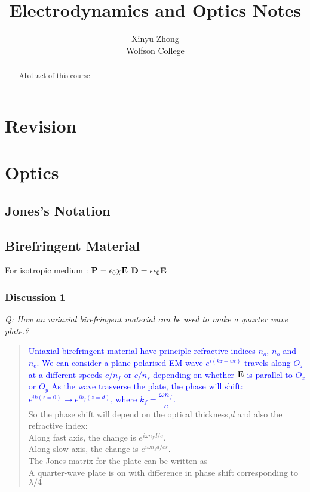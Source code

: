 \documentclass[12pt,a4paper]{article}
\author{Xinyu Zhong\\Wolfson College}
\title{Electrodynamics and Optics Notes}
\begin{document}
\begin{titlepage}
    \maketitle
\end{titlepage}

\tableofcontents

\newpage

\begin{abstract}
\noindent
Abstract of this course
\end{abstract}

\section{Revision}
\section{Optics}
\subsection{Jones's Notation}
\subsection{Birefringent Material}
For isotropic medium :
$\vb{P}=\epsilon_0\chi\vb{E}$
$\vb{D} =\epsilon\epsilon_0\vb{E}$

\subsubsection{Discussion 1}
    \textit{Q: How an uniaxial birefringent material can be used to make a quarter wave plate.?}\\
    \begin{quote}
    \textcolor{blue}{
    Uniaxial birefringent material have principle refractive indices $n_o$, $n_o$ and $n_e$. 
    We can consider a plane-polarised EM wave $e^{i(kz-wt)}$ travels along $O_z$
    at a different speeds $c/n_f$ or $c/n_s$ depending on whether $\vb{E}$ is parallel to $O_x$ or $O_y$
    As the wave trasverse the plate, the phase will shift: $e^{ik(z=0)}\rightarrow e^{ik_f(z=d)}$,
    where $k_f=\dfrac{\omega n_f}{c}$.\\}
    So the phase shift will depend on the optical thickness,$d$ and also the refractive index:\\
    Along fast axis, the change is $e^{i\omega n_f d/c}$.\\
    Along slow axis, the change is $e^{i\omega n_s d/cs}$.\\
    The Jones matrix for the plate can be written as\\
    A quarter-wave plate is on with difference in phase shift corresponding to $\lambda /4 $\\
    \end {quote}
\end{document}
